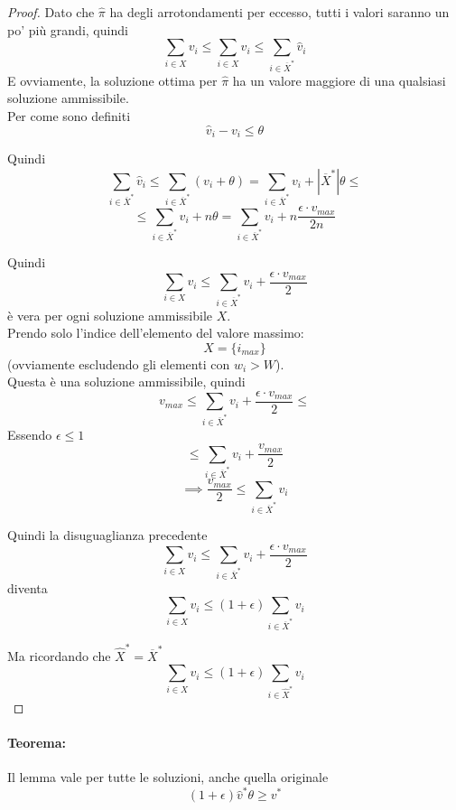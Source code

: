 \documentclass[11pt]{article}
\begin{document}
	\begin{proof}
		Dato che $\hat \pi$ ha degli arrotondamenti per eccesso, tutti i valori saranno un po' più grandi, quindi 
		$$ \sum_{i \in X} v_i \leq \sum_{i \in X} \hat v_i \leq \sum_{i \in \overline X^\ast} \hat v_i $$
		E ovviamente, la soluzione ottima per $\hat \pi$ ha un valore maggiore di una qualsiasi soluzione ammissibile.\\
		
		
		Per come sono definiti 
		$$\hat v_i - v_i \leq \theta $$
		
		Quindi 
		$$ \sum_{i \in \overline X^\ast} \hat v_i 
		\leq \sum_{i \in \overline X^\ast} (v_i + \theta) 
		= \sum_{i \in \overline X^\ast} v_i + |\overline X^\ast| \theta \leq $$
		$$\leq \sum_{i \in \overline X^\ast} v_i + n \theta 
		= \sum_{i \in \overline X^\ast} v_i + n \frac{\epsilon \cdot v_{max}}{2n}
		$$ 
		
		Quindi 
		$$ \sum_{i \in X} v_i \leq \sum_{i \in \overline X^\ast} v_i + \frac{\epsilon \cdot v_{max}}{2} $$
		è vera per ogni soluzione ammissibile $X$.\\
		
		Prendo solo l'indice dell'elemento del valore massimo:
		$$ X = \{i_{max}\}$$
		(ovviamente escludendo gli elementi con $w_i>W$).\\
		
		Questa è una soluzione ammissibile, quindi
		$$ v_{max} \leq \sum_{i \in \overline X^\ast} v_i + \frac{\epsilon \cdot v_{max}}{2} \leq  $$
		Essendo $\epsilon \leq 1$
		$$\leq  \sum_{i \in \overline X^\ast} v_i + \frac{v_{max}}{2}$$
		$$ \implies \frac{v_{max}}{2} \leq \sum_{i \in \overline X^\ast} v_i $$
		
		Quindi la disuguaglianza precedente
		$$ \sum_{i \in X} v_i \leq \sum_{i \in \overline X^\ast} v_i + \frac{\epsilon \cdot v_{max}}{2} $$
		diventa
		$$ \sum_{i \in X} v_i \leq (1 + \epsilon) \sum_{i \in \overline X^\ast} v_i$$
		
		Ma ricordando che $\hat X^\ast = \overline X^\ast$
		$$ \sum_{i \in X} v_i \leq (1 + \epsilon) \sum_{i \in \hat X^\ast} v_i $$
	\end{proof}
	
	\newpage
	
	\paragraph{Teorema:} Il lemma vale per tutte le soluzioni, anche quella originale
	$$(1 + \epsilon) \hat v^\ast \theta \geq v^\ast$$
	
\end{document}

